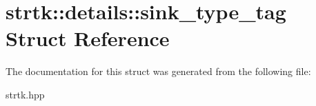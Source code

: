 \hypertarget{structstrtk_1_1details_1_1sink__type__tag}{\section{strtk\-:\-:details\-:\-:sink\-\_\-type\-\_\-tag Struct Reference}
\label{structstrtk_1_1details_1_1sink__type__tag}
}


The documentation for this struct was generated from the following file\-:\begin{DoxyCompactItemize}
\item 
strtk.\-hpp\end{DoxyCompactItemize}
